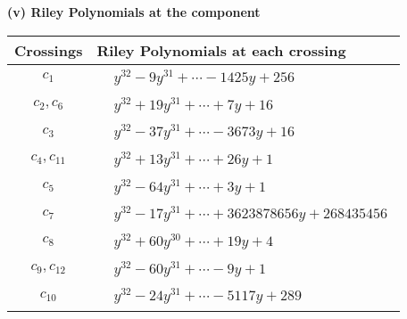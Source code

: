 \documentclass[1p]{elsarticle_modified}
\theoremstyle{definition}
\begin{document}
\newpage\renewcommand{\arraystretch}{1}
\flushleft \textbf{(v) Riley Polynomials at the component}\newline \\
\begin{tabular}{m{50pt}|m{274pt}}
Crossings & \hspace{64pt}Riley Polynomials at each crossing \\
\hline $$\begin{aligned}c_{1}\end{aligned}$$&$\begin{aligned}
&y^{32}-9 y^{31}+\cdots-1425 y+256
\end{aligned}$\\
\hline $$\begin{aligned}c_{2},c_{6}\end{aligned}$$&$\begin{aligned}
&y^{32}+19 y^{31}+\cdots+7 y+16
\end{aligned}$\\
\hline $$\begin{aligned}c_{3}\end{aligned}$$&$\begin{aligned}
&y^{32}-37 y^{31}+\cdots-3673 y+16
\end{aligned}$\\
\hline $$\begin{aligned}c_{4},c_{11}\end{aligned}$$&$\begin{aligned}
&y^{32}+13 y^{31}+\cdots+26 y+1
\end{aligned}$\\
\hline $$\begin{aligned}c_{5}\end{aligned}$$&$\begin{aligned}
&y^{32}-64 y^{31}+\cdots+3 y+1
\end{aligned}$\\
\hline $$\begin{aligned}c_{7}\end{aligned}$$&$\begin{aligned}
&y^{32}-17 y^{31}+\cdots+3623878656 y+268435456
\end{aligned}$\\
\hline $$\begin{aligned}c_{8}\end{aligned}$$&$\begin{aligned}
&y^{32}+60 y^{30}+\cdots+19 y+4
\end{aligned}$\\
\hline $$\begin{aligned}c_{9},c_{12}\end{aligned}$$&$\begin{aligned}
&y^{32}-60 y^{31}+\cdots-9 y+1
\end{aligned}$\\
\hline $$\begin{aligned}c_{10}\end{aligned}$$&$\begin{aligned}
&y^{32}-24 y^{31}+\cdots-5117 y+289
\end{aligned}$\\
\hline
\end{tabular}\\~\\
\end{document}

